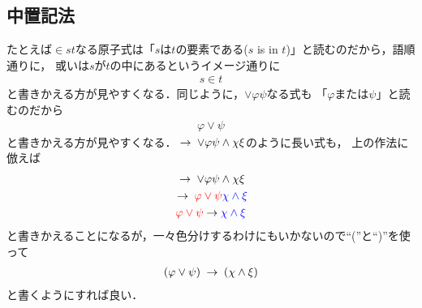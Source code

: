 \subsection{中置記法}
	たとえば$\in s t$なる原子式は「$s$は$t$の要素である($s$ is in $t$)」と読むのだから，語順通りに，
	或いは$s$が$t$の中にあるというイメージ通りに
	\begin{align}
		s \in t
	\end{align}
	と書きかえる方が見やすくなる．同じように，$\vee \varphi \psi$なる式も
	「$\varphi$または$\psi$」と読むのだから
	\begin{align}
		\varphi \vee \psi
	\end{align}
	と書きかえる方が見やすくなる．$\hspace{0.25em}\rightarrow\hspace{0.25em} \vee \varphi \psi \wedge \chi \xi$のように長い式も，
	上の作法に倣えば
	\begin{align}
		\begin{gathered}
			\hspace{0.25em}\rightarrow\hspace{0.25em} \vee \varphi \psi \wedge \chi \xi \\
			\hspace{0.25em}\rightarrow\hspace{0.25em} \color{red}{\varphi \vee \psi} \color{blue}{\chi \wedge \xi} \\
			\color{red}{\varphi \vee \psi} \color{black}{\hspace{0.25em}\rightarrow\hspace{0.25em}} \color{blue}{\chi \wedge \xi}
		\end{gathered}
	\end{align}
	と書きかえることになるが，一々色分けするわけにもいかないので``(''と``)''を使って
	\begin{align}
		(\varphi \vee \psi) \hspace{0.25em}\rightarrow\hspace{0.25em} (\chi \wedge \xi)
	\end{align}
	と書くようにすれば良い．
	
